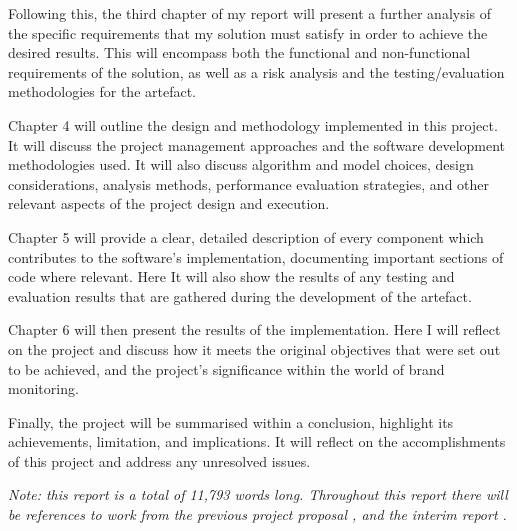 Following this, the third chapter of my report will present a further analysis of the specific requirements that my solution must satisfy in order to achieve the desired results. This will encompass both the functional and non-functional requirements of the solution, as well as a risk analysis and the testing/evaluation methodologies for the artefact.

Chapter 4 will outline the design and methodology implemented in this project. It will discuss the project management approaches and the software development methodologies used. It will also discuss algorithm and model choices, design considerations, analysis methods, performance evaluation strategies, and other relevant aspects of the project design and execution.

Chapter 5 will provide a clear, detailed description of every component which contributes to the software's implementation, documenting important sections of code where relevant. Here It will also show the results of any testing and evaluation results that are gathered during the development of the artefact.

Chapter 6 will then present the results of the implementation. Here I will reflect on the project and discuss how it meets the original objectives that were set out to be achieved, and the project's significance within the world of brand monitoring.

Finally, the project will be summarised within a conclusion, highlight its achievements, limitation, and implications. It will reflect on the accomplishments of this project and address any unresolved issues.

\textit{Note: this report is a total of 11,793 words long. Throughout this report there will be references to work from the previous project proposal \citep{atkinson2023proposal}, and the interim report \citep{atkinson2024interim}.}